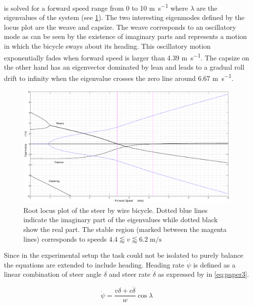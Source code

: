 is solved for a forward speed range from 0 to 10 \si{\meter\per\second} where \ensuremath{\lambda} are the eigenvalues of the system (see \cref{fig:paper2}). The two interesting eigenmodes defined by the locus plot are the weave and capsize. The weave corresponds to an oscillatory mode as can be seen by the existence of imaginary parts and represents a motion in which the bicycle sways about its heading. This oscillatory motion exponentially fades when forward speed is larger than 4.39 \si{\meter\per\second}. The capsize on the other hand has an eigenvector dominated by lean and leads to a gradual roll drift to infinity when the eigenvalue crosses the zero line around 6.67 \si{\meter\per\second}.
\begin{figure}[ht]
    \centering
    \captionsetup{justification=centering,margin=2cm}

    \includegraphics[width=\linewidth]{images/root_locus_steerbywire.eps}
    \caption{Root locus plot of the steer by wire bicycle. Dotted blue lines indicate the imaginary part of the eigenvalues while dotted black show the real part. The stable region (marked between the magenta lines) corresponds to speeds  \ensuremath{4.4\lessapprox v \lessapprox 6.2\; \si{\meter\per\second}}}
    \label{fig:paper2}
\end{figure}
Since in the experimental setup the task could not be isolated to purely balance the equations are extended to include heading. Heading rate \ensuremath{\dot{\psi}} is defined as a linear combination of steer angle \ensuremath{\delta} and steer rate \ensuremath{\dot{\delta}} as expressed by \citet{meijaard2007linearized} in \cref{eq:paper3}. 

\begin{equation}
    \dot{\psi}=\frac{v \delta+c \dot{\delta}}{w} \cos \lambda
    \label{eq:paper3}
    \end{equation}


